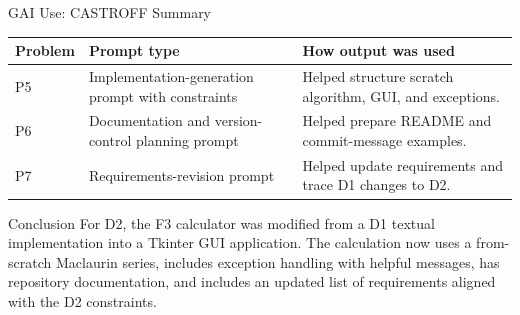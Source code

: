 \documentclass[aspectratio=169,11pt]{beamer}
\begin{document}
\begin{frame}{GAI Use: CASTROFF Summary}
\small
\begin{tabular}{p{}p{}p{}}
\toprule
\textbf{Problem} & \textbf{Prompt type} & \textbf{How output was used} \\
\midrule
P5 & Implementation-generation prompt with constraints & Helped structure scratch algorithm, GUI, and exceptions. \\
P6 & Documentation and version-control planning prompt & Helped prepare README and commit-message examples. \\
P7 & Requirements-revision prompt & Helped update requirements and trace D1 changes to D2. \\
\bottomrule
\end{tabular}
\end{frame}

\begin{frame}{Conclusion}
\large
For D2, the F3 calculator was modified from a D1 textual implementation into a Tkinter GUI application. The calculation now uses a from-scratch Maclaurin series, includes exception handling with helpful messages, has repository documentation, and includes an updated list of requirements aligned with the D2 constraints.
\end{frame}
\end{document}
